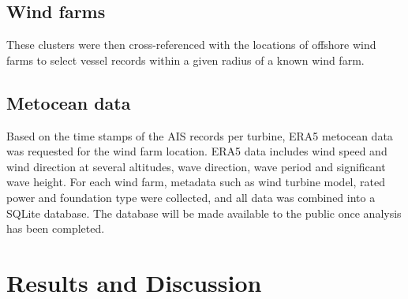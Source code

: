 \documentclass[wes, manuscript]{copernicus}
\begin{document}
\subsection{Wind farms}
These clusters were then cross-referenced with the 
locations of offshore wind farms to select vessel records within a given radius of a 
known wind farm. 

\subsection{Metocean data}
Based on the time stamps of the AIS records per turbine, ERA5 metocean data was 
requested for the wind farm location. ERA5 data includes wind speed and wind direction at several 
altitudes, wave direction, wave period and significant wave height. For each wind farm, 
metadata such as wind turbine model, rated power and foundation type were collected, 
and all data was combined into a SQLite database. The database will be made available 
to the public once analysis has been completed. 

\clearpage
\newpage

\section{Results and Discussion}
\end{document}
